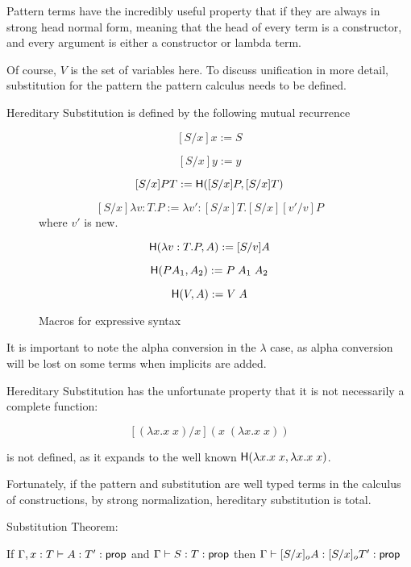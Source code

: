 Pattern terms have the incredibly useful property that if they are always in strong head normal form, meaning
that the head of every term is a constructor, and every argument is either a constructor or lambda term.

Of course, $V$ is the set of variables here.
To discuss unification in more detail, substitution for the pattern the pattern calculus
needs to be defined.

\begin{definition}
Hereditary Substitution is defined by the following mutual recurrence

\begin{figure}[H]

\[
[S/x] x := S
\]

\[
[S/x] y := y
\]

\[
[S/x] P T := \mathsf{H}([S/x] P, [S/x]T)
\]

\[
[S/x] \lambda v : T . P := \lambda v' : [S/x]T . [S/x][v'/v]P
\] where $v'$ is new.

\[
\mathsf{H}(\lambda v : T . P , A) := [S/v] A
\]

\[ 
\mathsf{H}(P A_1 , A_2) := P\;A_1\;A_2
\] 

\[ 
\mathsf{H}(V , A) := V\; A
\] 
\caption{Macros for expressive syntax}
\label{def:hered}
\end{figure}

\end{definition}

It is important to note the alpha conversion in the $\lambda$ case, as alpha conversion will be lost on 
some terms when implicits are added.

Hereditary Substitution has the unfortunate property that it is not necessarily a complete function:

\[
[(\lambda x . x\; x) / x ] ( x \; (\lambda x . x\; x) )
\]

is not defined, as it expands to the well known $\mathsf{H}(\lambda x . x \; x , \lambda x . x \; x)$.

Fortunately, if the pattern and substitution are well typed terms in the calculus of constructions, by 
strong normalization, hereditary substitution is total.

\begin{theorem} Substitution Theorem:

If $\Gamma,x : T \vdash A : T' : \mathsf{prop}$  and $\Gamma \vdash S : T : \mathsf{prop}$ then
$ \Gamma \vdash [S/x]_o A : [S/x]_o T' : \mathsf{prop}$
\end{theorem}

